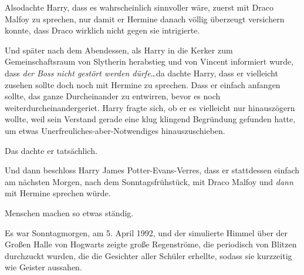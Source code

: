 Alsodachte Harry, dass es wahrscheinlich sinnvoller wäre, zuerst mit Draco Malfoy zu sprechen, nur damit er Hermine danach völlig überzeugt versichern konnte, dass Draco wirklich nicht gegen sie intrigierte.

Und später nach dem Abendessen, als Harry in die Kerker zum Gemeinschaftsraum von Slytherin herabstieg und von Vincent informiert wurde, dass \emph{der Boss nicht gestört werden dürfe}…da dachte Harry, dass er vielleicht zusehen sollte doch noch mit Hermine zu sprechen. Dass er einfach anfangen sollte, das ganze Durcheinander zu entwirren, bevor es noch weiterdurcheinandergeriet. Harry fragte sich, ob er es vielleicht nur hinauszögern wollte, weil sein Verstand gerade eine klug klingend Begründung gefunden hatte, um etwas Unerfreuliches-aber-Notwendiges hinauszuschieben.

Das dachte er tatsächlich.

Und dann beschloss Harry James Potter-Evans-Verres, dass er stattdessen einfach am nächsten Morgen, nach dem Sonntagsfrühstück, mit Draco Malfoy und \emph{dann} mit Hermine sprechen würde.

Menschen machen so etwas ständig.

\later

Es war Sonntagmorgen, am 5. April 1992, und der simulierte Himmel über der Großen Halle von Hogwarts zeigte große Regenströme, die periodisch von Blitzen durchzuckt wurden, die die Gesichter aller Schüler erhellte, sodass sie kurzzeitig wie Geister aussahen.

